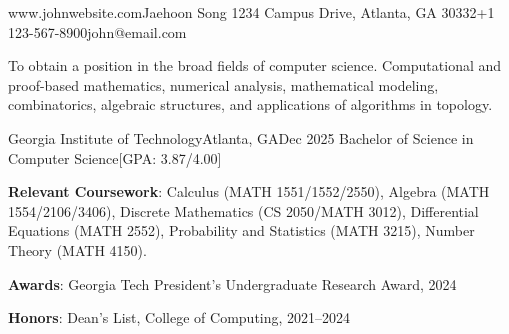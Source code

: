% 




\begin{resume-header}
  {www.johnwebsite.com}{Jaehoon Song}
  {1234 Campus Drive, Atlanta, GA 30332}{+1 123-567-8900}{john@email.com}
\end{resume-header}



\begin{resume-objective}
To obtain a position in the broad fields of computer science.
Computational and proof-based mathematics, numerical analysis, mathematical modeling, combinatorics, algebraic structures, and applications of algorithms in topology.
\end{resume-objective}








\begin{resume-itemize}
  {Georgia Institute of Technology}{Atlanta, GA}{Dec 2025}
  {Bachelor of Science in Computer Science}[GPA: 3.87/4.00]
    \item \textbf{Relevant Coursework}: Calculus (MATH 1551/1552/2550), 
    Algebra (MATH 1554/2106/3406), 
    Discrete Mathematics (CS 2050/MATH 3012), 
    Differential Equations (MATH 2552), 
    Probability and Statistics (MATH 3215), 
    Number Theory (MATH 4150).
    \item \textbf{Awards}: Georgia Tech President's Undergraduate Research Award, 2024
    \item \textbf{Honors}: Dean's List, College of Computing, 2021--2024
\end{resume-itemize}


